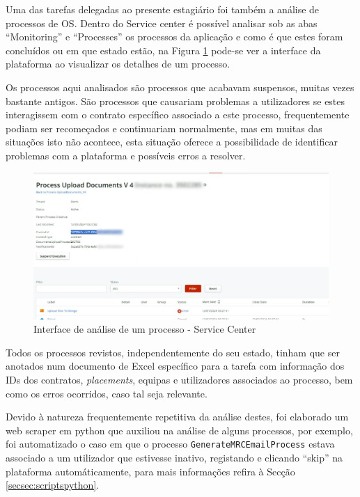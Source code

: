        Uma das tarefas delegadas ao presente estagiário foi também a análise de processos de OS. Dentro do Service center é possível analisar sob as abas ``Monitoring'' e ``Processes'' os processos da aplicação e como é que estes foram concluídos ou em que estado estão, na Figura \ref{fig:interface_processo_servicecenter} pode-se ver a interface da plataforma ao visualizar os detalhes de um processo.

        Os processos aqui analisados são processos que acabavam suspensos, muitas vezes bastante antigos. São processos que causariam problemas a utilizadores se estes interagissem com o contrato específico associado a este processo, frequentemente podiam ser recomeçados e continuariam normalmente, mas em muitas das situações isto não acontece, esta situação oferece a possibilidade de identificar problemas com a plataforma e possíveis erros a resolver.

        \begin{figure}[H]
            \centering
            \includegraphics[width=\textwidth]{imgs/ProcessoServiceCenter.png}
            \caption{Interface de análise de um processo - Service Center}\label{fig:interface_processo_servicecenter}
        \end{figure}

        Todos os processos revistos, independentemente do seu estado, tinham que ser anotados num documento de Excel específico para a tarefa com informação dos IDs dos contratos, \textit{placements}, equipas e utilizadores associados ao processo, bem como os erros ocorridos, caso tal seja relevante.

        Devido à natureza frequentemente repetitiva da análise destes, foi elaborado um web scraper em python que auxiliou na análise de alguns processos, por exemplo, foi automatizado o caso em que o processo \texttt{GenerateMRCEmailProcess} estava associado a um utilizador que estivesse inativo, registando e clicando ``skip'' na plataforma automáticamente, para mais informações refira à Secção \ref{secsec:scriptspython}.

